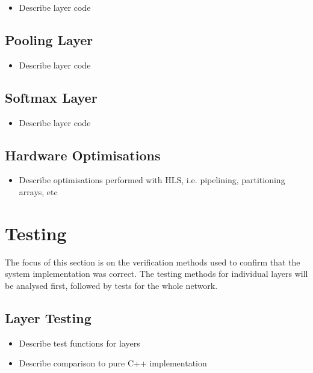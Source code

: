 \documentclass[12pt]{article}
\begin{document}
\begin{itemize}
\item Describe layer code
\end{itemize}

\subsection{Pooling Layer}
\label{sec:Imp-Pool}


\begin{itemize}
\item Describe layer code
\end{itemize}

\subsection{Softmax Layer}
\label{sec:Imp-Prob}


\begin{itemize}
\item Describe layer code
\end{itemize}

\subsection{Hardware Optimisations}
\label{sec:Imp-Optimisations}


\begin{itemize}
\item Describe optimisations performed with HLS, i.e. pipelining, partitioning arrays, etc
\end{itemize}

\newpage

\section{Testing}
\label{sec:Test}


The focus of this section is on the verification methods used to confirm that the system implementation was correct. The testing methods for individual layers will be analysed first, followed by tests for the whole network.

\subsection{Layer Testing}
\label{sec:Test-Layers}


\begin{itemize}
\item Describe test functions for layers
\item Describe comparison to pure C++ implementation
\end{itemize}
\end{document}
